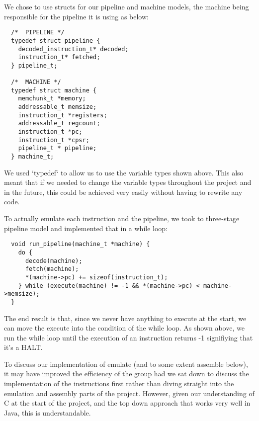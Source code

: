 We chose to use structs for our pipeline and machine models, the machine being responsible for the pipeline it is using as below:

\begin{verbatim}
  /*  PIPELINE */
  typedef struct pipeline {
    decoded_instruction_t* decoded;
    instruction_t* fetched;
  } pipeline_t;

  /*  MACHINE */
  typedef struct machine {
    memchunk_t *memory;
    addressable_t memsize;
    instruction_t *registers;
    addressable_t regcount;
    instruction_t *pc;
    instruction_t *cpsr;
    pipeline_t * pipeline;
  } machine_t;
\end{verbatim}

We used `typedef` to allow us to use the variable types shown above. This also meant that if we needed to change the variable types throughout the project and in the future, this could be achieved very easily without having to rewrite any code.

To actually emulate each instruction and the pipeline, we took to three-stage pipeline model and implemented that in a while loop: 

\begin{verbatim}
  void run_pipeline(machine_t *machine) {
    do {
      decode(machine);
      fetch(machine);
      *(machine->pc) += sizeof(instruction_t);
    } while (execute(machine) != -1 && *(machine->pc) < machine->memsize);
  }
\end{verbatim}

The end result is that, since we never have anything to execute at the start, we can move the execute into the condition of the while loop. As shown above, we run the while loop until the execution of an instruction returns -1 signifiying that it's a HALT.

To discuss our implementation of emulate (and to some extent assemble below), it may have improved the efficiency of the group had we sat down to discuss the implementation of the instructions first rather than diving straight into the emulation and assembly parts of the project. However, given our understanding of C at the start of the project, and the top down approach that works very well in Java, this is understandable.
